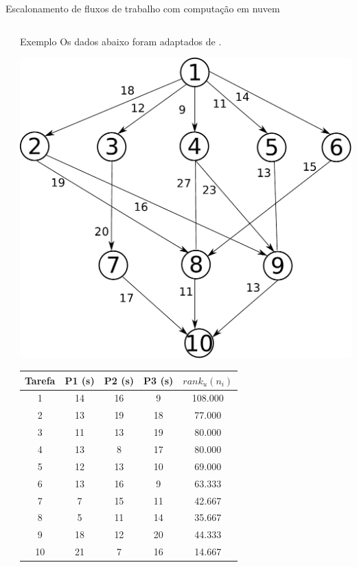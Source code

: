 \documentclass[final]{beamer}
\begin{document}
\begin{frame}[t]
\begin{columns}[t]
\begin{column}{0.60\paperwidth}
\begin{block}{Escalonamento de fluxos de trabalho com computação em nuvem}
\begin{columns}[totalwidth=0.60\paperwidth]
\begin{column}{0.33\paperwidth}
		\end{column}
		\begin{column}{0.28\paperwidth}
		\begin{block}{Exemplo}
		Os dados abaixo foram adaptados de \cite{topcoglu:heft}.
			
			\begin{center}
				\includegraphics[width=0.68\columnwidth]{dag_heft.pdf}
			\end{center}	

			\begin{table}[ht]
			\small
			\centering
			\begin{tabular}{|c|c|c|c|c|}
			\hline
			\textbf{Tarefa} & \textbf{P1 (s)} & \textbf{P2 (s)} & \textbf{P3 (s)} & $rank_u(n_i)$ \\ \hline
			1               & 14          & 16          & 9           & 108.000       \\
			2               & 13          & 19          & 18          & 77.000        \\
			3               & 11          & 13          & 19          & 80.000        \\
			4               & 13          & 8           & 17          & 80.000        \\
			5               & 12          & 13          & 10          & 69.000        \\
			6               & 13          & 16          & 9           & 63.333        \\
			7               & 7           & 15          & 11          & 42.667        \\
			8               & 5           & 11          & 14          & 35.667        \\
			9               & 18          & 12          & 20          & 44.333        \\
			10              & 21          & 7           & 16          & 14.667        \\ \hline
			\end{tabular}
			\end{table}		


\end{block}
\end{column}
\end{columns}
\end{block}
\end{column}
\end{columns}
\end{frame}
\end{document}
